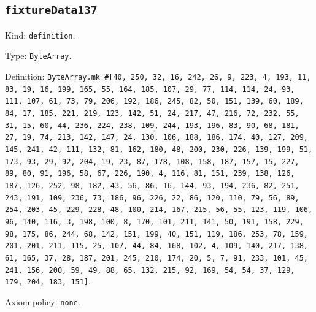 \documentclass[11pt]{article}
\begin{document}
\subsection*{\texttt{fixtureData137}}
\noindent Kind: \texttt{definition}.\par
\noindent Type: \texttt{ByteArray}.\par
\noindent Definition: \texttt{ByteArray.mk \#[40, 250, 32, 16, 242, 26, 9, 223, 4, 193, 11, 83, 19, 16, 199, 165, 55, 164, 185, 107, 29, 77, 114, 114, 24, 93, 111, 107, 61, 73, 79, 206, 192, 186, 245, 82, 50, 151, 139, 60, 189, 84, 17, 185, 221, 219, 123, 142, 51, 24, 217, 47, 216, 72, 232, 55, 31, 15, 60, 44, 236, 224, 238, 109, 244, 193, 196, 83, 90, 68, 181, 27, 19, 74, 213, 142, 147, 24, 130, 106, 188, 186, 174, 40, 127, 209, 145, 241, 42, 111, 132, 81, 162, 180, 48, 200, 230, 226, 139, 199, 51, 173, 93, 29, 92, 204, 19, 23, 87, 178, 108, 158, 187, 157, 15, 227, 89, 80, 91, 196, 58, 67, 226, 190, 4, 116, 81, 151, 239, 138, 126, 187, 126, 252, 98, 182, 43, 56, 86, 16, 144, 93, 194, 236, 82, 251, 243, 191, 109, 236, 73, 186, 96, 226, 22, 86, 120, 110, 79, 56, 89, 254, 203, 45, 229, 228, 48, 100, 214, 167, 215, 56, 55, 123, 119, 106, 96, 140, 116, 3, 198, 100, 8, 170, 101, 211, 141, 50, 191, 158, 229, 98, 175, 86, 244, 68, 142, 151, 199, 40, 151, 119, 186, 253, 78, 159, 201, 201, 211, 115, 25, 107, 44, 84, 168, 102, 4, 109, 140, 217, 138, 61, 165, 37, 28, 187, 201, 245, 210, 174, 20, 5, 7, 91, 233, 101, 45, 241, 156, 200, 59, 49, 88, 65, 132, 215, 92, 169, 54, 54, 37, 129, 179, 204, 183, 151]}.\par
\noindent Axiom policy: \texttt{none}.\par
\end{document}

